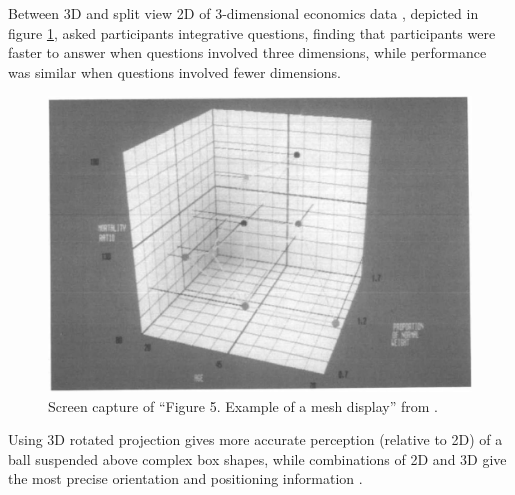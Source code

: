 \documentclass{monashthesis}
\begin{document}
Between 3D and split view 2D of 3-dimensional economics data
\textcite{wickens_implications_1994}, depicted in figure
\ref{fig:wickens94fig}, asked participants integrative questions,
finding that participants were faster to answer when questions involved
three dimensions, while performance was similar when questions involved
fewer dimensions.




\begin{figure}

{\centering \includegraphics[width=0.7\linewidth]{./figures/wickens94fig} 

}

\caption{Screen capture of ``Figure 5. Example of a mesh
display'' from \textcite{wickens_implications_1994}.}\label{fig:wickens94fig}
\end{figure}

Using 3D rotated projection gives more accurate perception (relative to
2D) of a ball suspended above complex box shapes, while combinations of
2D and 3D give the most precise orientation and positioning information
\autocite[depicted in figure
\ref{fig:tory06fig}]{tory_visualization_2006}.
\end{document}
